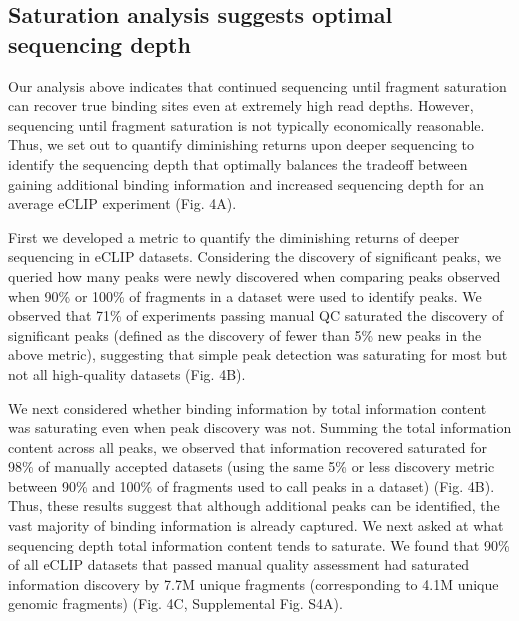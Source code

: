\subsection{Saturation analysis suggests optimal sequencing depth}
Our analysis above indicates that continued sequencing until fragment saturation can recover true binding sites even at extremely high read depths. However, sequencing until fragment saturation is not typically economically reasonable. Thus, we set out to quantify diminishing returns upon deeper sequencing to identify the sequencing depth that optimally balances the tradeoff between gaining additional binding information and increased sequencing depth for an average eCLIP experiment (Fig. 4A).

First we developed a metric to quantify the diminishing returns of deeper sequencing in eCLIP datasets. Considering the discovery of significant peaks, we queried how many peaks were newly discovered when comparing peaks observed when 90\% or 100\% of fragments in a dataset were used to identify peaks. We observed that 71\% of experiments passing manual QC saturated the discovery of significant peaks (defined as the discovery of fewer than 5\% new peaks in the above metric), suggesting that simple peak detection was saturating for most but not all high-quality datasets (Fig. 4B).

We next considered whether binding information by total information content was saturating even when peak discovery was not. Summing the total information content across all peaks, we observed that information recovered saturated for 98\% of manually accepted datasets (using the same 5\% or less discovery metric between 90\% and 100\% of fragments used to call peaks in a dataset) (Fig. 4B). Thus, these results suggest that although additional peaks can be identified, the vast majority of binding information is already captured. We next asked at what sequencing depth total information content tends to saturate. We found that 90\% of all eCLIP datasets that passed manual quality assessment had saturated information discovery by 7.7M unique fragments (corresponding to 4.1M unique genomic fragments) (Fig. 4C, Supplemental Fig. S4A).

